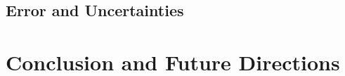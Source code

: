 \documentclass[11pt, twocolumn]{article}
\begin{document}
\subsection{Error and Uncertainties} 


\section{Conclusion and Future Directions} 





\end{document}

